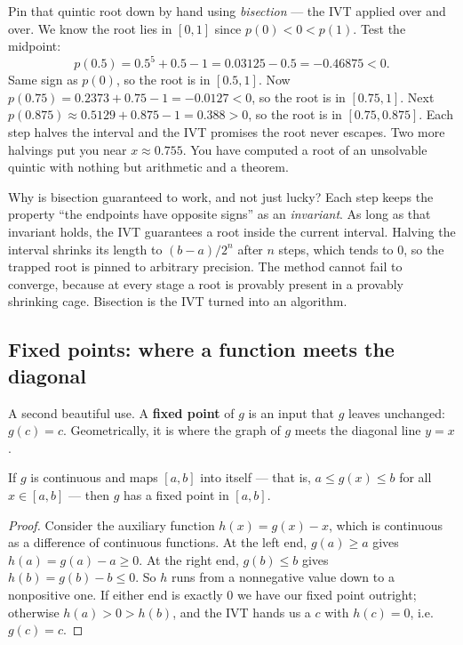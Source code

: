 \begin{labbox}
Pin that quintic root down by hand using \emph{bisection} --- the IVT applied over and
over. We know the root lies in $[0,1]$ since $p(0)<0<p(1)$. Test the midpoint:
\[
  p(0.5)=0.5^5+0.5-1=0.03125-0.5=-0.46875<0.
\]
Same sign as $p(0)$, so the root is in $[0.5,1]$. Now $p(0.75)=0.2373+0.75-1=-0.0127<0$, so
the root is in $[0.75,1]$. Next $p(0.875)\approx 0.5129+0.875-1=0.388>0$, so the root is in
$[0.75,0.875]$. Each step halves the interval and the IVT promises the root never escapes.
Two more halvings put you near $x\approx 0.755$. You have computed a root of an unsolvable
quintic with nothing but arithmetic and a theorem.
\end{labbox}

\begin{whybox}
Why is bisection guaranteed to work, and not just lucky? Each step keeps the property ``the
endpoints have opposite signs'' as an \emph{invariant}. As long as that invariant holds, the
IVT guarantees a root inside the current interval. Halving the interval shrinks its length
to $(b-a)/2^n$ after $n$ steps, which tends to $0$, so the trapped root is pinned to
arbitrary precision. The method cannot fail to converge, because at every stage a root is
provably present in a provably shrinking cage. Bisection is the IVT turned into an
algorithm.
\end{whybox}

\subsection{Fixed points: where a function meets the diagonal}

A second beautiful use. A \textbf{fixed point} of $g$ is an input that $g$ leaves
unchanged: $g(c)=c$. Geometrically, it is where the graph of $g$ meets the diagonal line
$y=x$.

\begin{corollary}
\label{ch08:cor-fixed}
If $g$ is continuous and maps $[a,b]$ into itself --- that is, $a\le g(x)\le b$ for all
$x\in[a,b]$ --- then $g$ has a fixed point in $[a,b]$.
\end{corollary}

\begin{proof}
Consider the auxiliary function $h(x)=g(x)-x$, which is continuous as a difference of
continuous functions. At the left end, $g(a)\ge a$ gives $h(a)=g(a)-a\ge 0$. At the right
end, $g(b)\le b$ gives $h(b)=g(b)-b\le 0$. So $h$ runs from a nonnegative value down to a
nonpositive one. If either end is exactly $0$ we have our fixed point outright; otherwise
$h(a)>0>h(b)$, and the IVT hands us a $c$ with $h(c)=0$, i.e.\ $g(c)=c$.
\end{proof}

